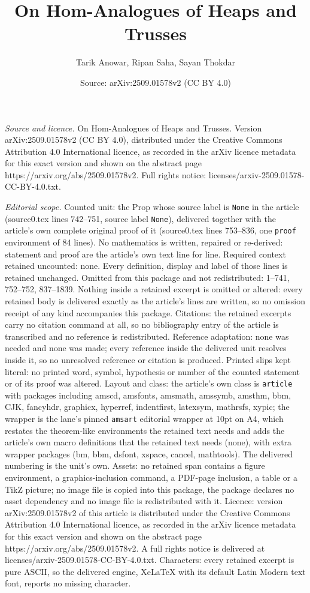 \documentclass[10pt,a4paper]{amsart}
\title[On Hom-Analogues of Heaps and Trusses]{On Hom-Analogues of Heaps and Trusses}
\author{Tarik Anowar, Ripan Saha, Sayan Thokdar}
\date{Source: arXiv:2509.01578v2 (CC BY 4.0)}
\begin{document}
\maketitle

\noindent\emph{Source and licence.} On Hom-Analogues of Heaps and Trusses. Version arXiv:2509.01578v2 (CC BY 4.0), distributed under the Creative Commons Attribution 4.0 International licence, as recorded in the arXiv licence metadata for this exact version and shown on the abstract page https://arxiv.org/abs/2509.01578v2. Full rights notice: licenses/arxiv-2509.01578-CC-BY-4.0.txt.\par\smallskip

\noindent\textit{Editorial scope.} Counted unit: the Prop whose source label is \texttt{None} in the article (source0.tex lines 742--751, source label \texttt{None}), delivered together with the article's own complete original proof of it (source0.tex lines 753--836, one \texttt{proof} environment of 84 lines). No mathematics is written, repaired or re-derived: statement and proof are the article's own text line for line. Required context retained uncounted: none. Every definition, display and label of those lines is retained unchanged. Omitted from this package and not redistributed: 1--741, 752--752, 837--1839. Nothing inside a retained excerpt is omitted or altered: every retained body is delivered exactly as the article's lines are written, so no omission receipt of any kind accompanies this package. Citations: the retained excerpts carry no citation command at all, so no bibliography entry of the article is transcribed and no reference is redistributed. Reference adaptation: none was needed and none was made; every reference inside the delivered unit resolves inside it, so no unresolved reference or citation is produced. Printed slips kept literal: no printed word, symbol, hypothesis or number of the counted statement or of its proof was altered. Layout and class: the article's own class is \texttt{article} with packages including amscd, amsfonts, amsmath, amssymb, amsthm, bbm, CJK, fancyhdr, graphicx, hyperref, indentfirst, latexsym, mathrsfs, xypic; the wrapper is the lane's pinned \texttt{amsart} editorial wrapper at 10pt on A4, which restates the theorem-like environments the retained text needs and adds the article's own macro definitions that the retained text needs (none), with extra wrapper packages (bm, bbm, dsfont, xspace, cancel, mathtools). The delivered numbering is the unit's own. Assets: no retained span contains a figure environment, a graphics-inclusion command, a PDF-page inclusion, a table or a TikZ picture; no image file is copied into this package, the package declares no asset dependency and no image file is redistributed with it. Licence: version arXiv:2509.01578v2 of this article is distributed under the Creative Commons Attribution 4.0 International licence, as recorded in the arXiv licence metadata for this exact version and shown on the abstract page https://arxiv.org/abs/2509.01578v2. A full rights notice is delivered at licenses/arxiv-2509.01578-CC-BY-4.0.txt. Characters: every retained excerpt is pure ASCII, so the delivered engine, XeLaTeX with its default Latin Modern text font, reports no missing character.
\end{document}
